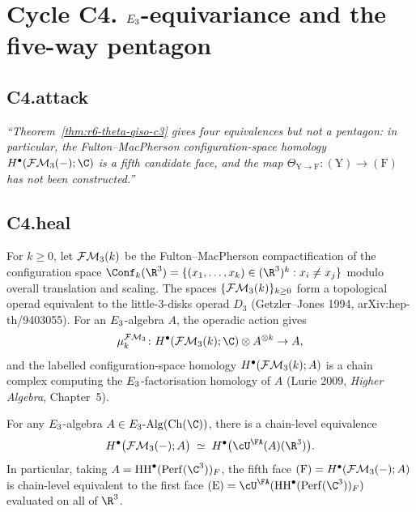 \section*{Cycle C4. $E_3$-equivariance and the five-way pentagon}

\subsection*{C4.attack}

\emph{``Theorem~\ref{thm:r6-theta-qiso-c3} gives four equivalences but
not a pentagon: in particular, the Fulton--MacPherson
configuration-space homology
$H^\bullet(\FM_3(-);\C)$ is a fifth candidate face, and the map
$\Theta_{\mathrm Y\to\mathrm F}\colon(\mathrm Y)\to(\mathrm F)$ has not
been constructed.''}

\subsection*{C4.heal}

\begin{definition}
\label{def:r6-fm3-operad}
For $k\geq 0$, let $\mathcal{FM}_3(k)$ be the Fulton--MacPherson compactification
of the configuration space
$\Conf_k(\R^3) = \{(x_1,\ldots,x_k)\in(\R^3)^k : x_i\neq x_j\}$
modulo overall translation and scaling. The spaces $\{\mathcal{FM}_3(k)\}_{k\ge 0}$
form a topological operad equivalent to the little-$3$-disks operad
$D_3$ (Getzler--Jones 1994, arXiv:hep-th/9403055). For an
$E_3$-algebra $A$, the operadic action gives
\[
\mu^{\FM_3}_k\colon H^\bullet(\FM_3(k);\C)\otimes A^{\otimes k}\to A,
\]
and the labelled configuration-space homology
$H^\bullet(\mathcal{FM}_3(k);A)$ is a chain complex computing the
$E_3$-factorisation homology of $A$ (Lurie 2009,
\emph{Higher Algebra}, Chapter~5).
\end{definition}

\begin{proposition}
\label{prop:r6-fm3-equals-envelope}
For any $E_3$-algebra $A\in\Ethree\text{-}\mathrm{Alg}(\mathrm{Ch}(\C))$,
there is a chain-level equivalence
\[
H^\bullet\bigl(\FM_3(-);A\bigr) \;\simeq\; H^\bullet\bigl(\cU^\FA(A)(\R^3)\bigr).
\]
In particular, taking $A = \HH^\bullet(\Perf(\C^3))_F$, the fifth face
$(\mathrm F) = H^\bullet(\mathcal{FM}_3(-);A)$ is chain-level equivalent to the
first face $(\mathrm E) = \cU^\FA(\HH^\bullet(\Perf(\C^3))_F)$ evaluated
on all of $\R^3$.
\end{proposition}

